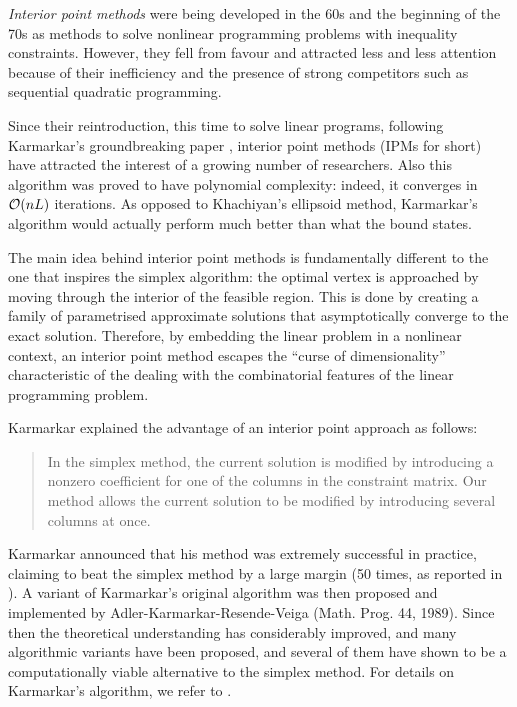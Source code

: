 {\em Interior point methods} were being developed in the 60s and the 
beginning of the 70s as methods to solve nonlinear programming problems 
with inequality constraints. 
However, they fell from favour and attracted less and less attention
because of their inefficiency and the presence of strong competitors
such as sequential quadratic programming.

Since their reintroduction, this time to solve linear programs, 
following Karmarkar's groundbreaking paper
\cite{Karmarkar}, interior point methods (IPMs for short) have attracted 
the interest of a growing number of researchers.
Also this algorithm was proved to have polynomial complexity: 
indeed, it converges in $\mathcal{O}(nL)$ iterations. As opposed to
Khachiyan's ellipsoid method, Karmarkar's algorithm would actually
perform much better than what the bound states.

The main idea behind interior point methods is fundamentally different 
to the one that inspires the simplex algorithm: the optimal vertex 
is approached by moving through the interior of the feasible region.
This is done by creating a family of parametrised approximate solutions
that asymptotically converge to the exact solution.
Therefore, by embedding the linear problem in a nonlinear context,
an interior point method escapes the ``curse of dimensionality''
characteristic of the dealing with the combinatorial features of the 
linear programming problem.

Karmarkar \cite{Karmarkar} explained the advantage of an
interior point approach as follows:
\begin{quote}
In the simplex method, the current solution is modified by introducing
a nonzero coefficient for one of the columns in the constraint
matrix. Our method allows the current solution to be modified by
introducing several columns at once.
\end{quote}


Karmarkar announced that his method was extremely successful in practice, 
claiming to beat the simplex method by a large margin (50 times,
as reported in \cite{MWright92}).
A variant of Karmarkar's original algorithm was then proposed and 
implemented by Adler-Karmarkar-Resende-Veiga 
(Math. Prog. 44, 1989).
Since then the theoretical understanding has considerably improved,
and many algorithmic variants have been proposed, and several of
them have shown to be a computationally viable alternative to the
simplex method.
For details on Karmarkar's algorithm, we refer to
\cite[ch.6]{FangPuthenpura93}.

